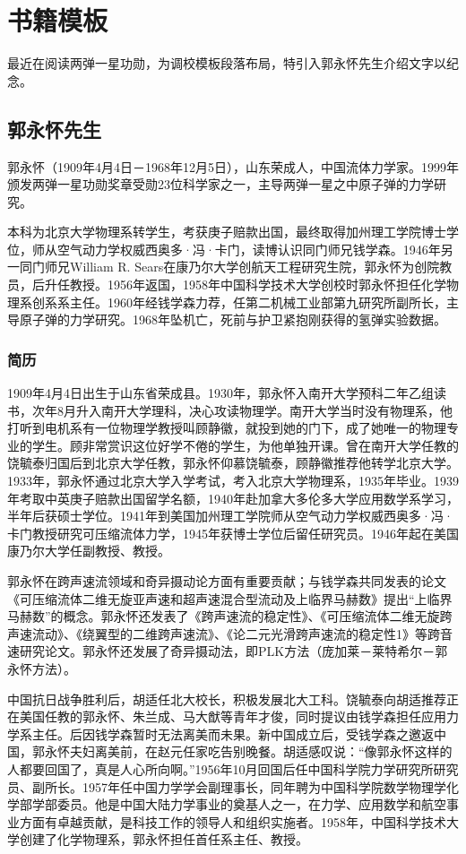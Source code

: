 \chapter{书籍模板}
\label{chap:main}

最近在阅读两弹一星功勋，为调校模板段落布局，特引入郭永怀先生介绍文字以纪念。

\section{郭永怀先生}

郭永怀（1909年4月4日－1968年12月5日），山东荣成人，中国流体力学家。1999年颁发两弹一星功勋奖章受勋23位科学家之一，主导两弹一星之中原子弹的力学研究。

本科为北京大学物理系转学生，考获庚子赔款出国，最终取得加州理工学院博士学位，师从空气动力学权威西奥多·冯·卡门，读博认识同门师兄钱学森。1946年另一同门师兄William R. Sears在康乃尔大学创航天工程研究生院，郭永怀为创院教员，后升任教授。1956年返国，1958年中国科学技术大学创校时郭永怀担任化学物理系创系系主任。1960年经钱学森力荐，任第二机械工业部第九研究所副所长，主导原子弹的力学研究。1968年坠机亡，死前与护卫紧抱刚获得的氢弹实验数据。

\subsection{简历}

1909年4月4日出生于山东省荣成县。1930年，郭永怀入南开大学预科二年乙组读书，次年8月升入南开大学理科，决心攻读物理学。南开大学当时没有物理系，他打听到电机系有一位物理学教授叫顾静徽，就投到她的门下，成了她唯一的物理专业的学生。顾非常赏识这位好学不倦的学生，为他单独开课。曾在南开大学任教的饶毓泰归国后到北京大学任教，郭永怀仰慕饶毓泰，顾静徽推荐他转学北京大学。1933年，郭永怀通过北京大学入学考试，考入北京大学物理系，1935年毕业。1939年考取中英庚子赔款出国留学名额，1940年赴加拿大多伦多大学应用数学系学习，半年后获硕士学位。1941年到美国加州理工学院师从空气动力学权威西奥多·冯·卡门教授研究可压缩流体力学，1945年获博士学位后留任研究员。1946年起在美国康乃尔大学任副教授、教授。

郭永怀在跨声速流领域和奇异摄动论方面有重要贡献；与钱学森共同发表的论文《可压缩流体二维无旋亚声速和超声速混合型流动及上临界马赫数》提出“上临界马赫数”的概念。郭永怀还发表了《跨声速流的稳定性》、《可压缩流体二维无旋跨声速流动》、《绕翼型的二维跨声速流》、《论二元光滑跨声速流的稳定性1》等跨音速研究论文。郭永怀还发展了奇异摄动法，即PLK方法（庞加莱－莱特希尔－郭永怀方法）。

中国抗日战争胜利后，胡适任北大校长，积极发展北大工科。饶毓泰向胡适推荐正在美国任教的郭永怀、朱兰成、马大猷等青年才俊，同时提议由钱学森担任应用力学系主任。后因钱学森暂时无法离美而未果。新中国成立后，受钱学森之邀返中国，郭永怀夫妇离美前，在赵元任家吃告别晚餐。胡适感叹说：“像郭永怀这样的人都要回国了，真是人心所向啊。”1956年10月回国后任中国科学院力学研究所研究员、副所长。1957年任中国力学学会副理事长，同年聘为中国科学院数学物理学化学部学部委员。他是中国大陆力学事业的奠基人之一，在力学、应用数学和航空事业方面有卓越贡献，是科技工作的领导人和组织实施者。1958年，中国科学技术大学创建了化学物理系，郭永怀担任首任系主任、教授。

